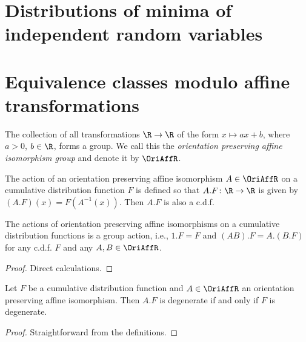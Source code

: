 \section{Distributions of minima of independent random variables}

\section{Equivalence classes modulo affine transformations}

\begin{definition}
  \label{def:oriented-affine-isomorphism}
  \leanok
  The collection of all transformations $\R \to \R$ of the form
  $x \mapsto a x + b$, where $a>0$, $b \in \R$, forms a group.
  We call this the \emph{orientation preserving affine isomorphism group}
  and denote it by $\OriAffR$.
\end{definition}

\begin{definition}
  \label{def:oriented-affine-transform-of-cdf}
  \leanok
  The action of an orientation preserving affine isomorphism $A \in \OriAffR$
  on a cumulative distribution function $F$ is defined so
  that $A.F \colon \R \to \R$ is given by $(A.F)(x) = F(A^{-1}(x))$.
  Then $A.F$ is also a c.d.f.
\end{definition}

\begin{lemma}
  \label{lem:oriented-affine-action-on-cdf}
  \leanok
  The actions of orientation preserving affine isomorphisms
  on a cumulative distribution functions is a group action, i.e.,
  $1.F = F$ and $(AB).F = A.(B.F)$ for any c.d.f. $F$ and any $A,B \in \OriAffR$.
\end{lemma}
\begin{proof}
  \uses{}
  Direct calculations.
\end{proof}

\begin{lemma}
  \label{lem:degenerate-cdf-transform}
  \leanok
  Let $F$ be a cumulative distribution function
  and $A \in \OriAffR$ an orientation preserving affine isomorphism.
  Then $A.F$ is degenerate if and only if $F$ is degenerate.
\end{lemma}
\begin{proof}
  \uses{}
  \leanok
  Straightforward from the definitions.
\end{proof}

